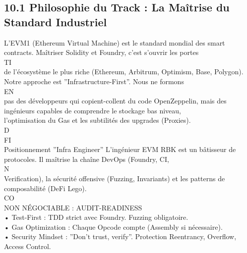 \documentclass[12pt,landscape,a4paper]{article}
\begin{document}
\subsection{10.1 Philosophie du Track : La Maîtrise du Standard Industriel}
L’EVM1 (Ethereum Virtual Machine) est le standard mondial des smart contracts. Maîtriser Solidity et Foundry, c’est s’ouvrir les portes\\
\vspace{0.5em}
\vspace{0.5em}
\vspace{0.5em}
\vspace{0.5em}
TI\\
de l’écosystème le plus riche (Ethereum, Arbitrum, Optimism, Base, Polygon). Notre approche est ”Infrastructure-First”. Nous ne formons\\
\vspace{0.5em}
\vspace{0.5em}
\vspace{0.5em}
\vspace{0.5em}
EN\\
pas des développeurs qui copient-collent du code OpenZeppelin, mais des ingénieurs capables de comprendre le stockage bas niveau,\\
l’optimisation du Gas et les subtilités des upgrades (Proxies).\\
\vspace{0.5em}
\vspace{0.5em}
\vspace{0.5em}
\vspace{0.5em}
D\\
FI\\
Positionnement ”Infra Engineer” L’ingénieur EVM RBK est un bâtisseur de protocoles. Il maîtrise la chaîne DevOps (Foundry, CI,\\
\vspace{0.5em}
N\\
Verification), la sécurité offensive (Fuzzing, Invariants) et les patterns de composabilité (DeFi Lego).\\
CO\\
NON NÉGOCIABLE : AUDIT-READINESS\\
• Test-First : TDD strict avec Foundry. Fuzzing obligatoire.\\
\vspace{0.5em}
• Gas Optimization : Chaque Opcode compte (Assembly si nécessaire).\\
\vspace{0.5em}
• Security Mindset : ”Don’t trust, verify”. Protection Reentrancy, Overflow, Access Control.\\
\end{document}
